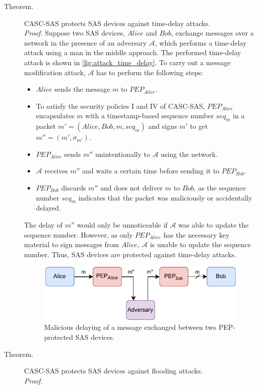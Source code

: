 \begin{description}
    \item[Theorem.] CASC-SAS protects SAS devices against time-delay attacks.\\
    \textit{Proof.} Suppose two SAS devices, $Alice$ and $Bob$, exchange messages over a network in the presence of an adversary $\mathcal{A}$, which performs a time-delay attack using a man in the middle approach.
    The performed time-delay attack is shown in \autoref{fig:attack_time_delay}.
    To carry out a message modification attack, $\mathcal{A}$ has to perform the following steps:
    \begin{itemize}
        \item $Alice$ sends the message $m$ to $PEP_{Alice}$.
        \item To satisfy the security policies I and IV of CASC-SAS, $PEP_{Alice}$ encapsulates $m$ with a timestamp-based sequence number $seq_m$ in a packet $m' = (Alice, Bob, m, seq_m)$ and signs $m'$ to get $m'' = (m', \sigma_{m'})$.
        \item $PEP_{Alice}$ sends $m''$ unintentionally to $\mathcal{A}$ using the network.
        \item $\mathcal{A}$ receives $m''$ and waits a certain time before sending it to $PEP_{Bob}$.
        \item $PEP_{Bob}$ discards $m''$ and does not deliver $m$ to $Bob$, as the sequence number $seq_m$ indicates that the packet was maliciously or accidentally delayed.
    \end{itemize}
    The delay of $m''$ would only be unnoticeable if $\mathcal{A}$ was able to update the sequence number.
    However, as only $PEP_{Alice}$ has the necessary key material to sign messages from $Alice$, $\mathcal{A}$ is unable to update the sequence number.
    Thus, SAS devices are protected against time-delay attacks.
    \begin{figure}
        \centering
        \includegraphics[width=0.75\linewidth]{figures/attack_time_delay.drawio.pdf}
        \caption{Malicious delaying of a message exchanged between two PEP-protected SAS devices.}
        \label{fig:attack_time_delay}
    \end{figure}

    \item[Theorem.] CASC-SAS protects SAS devices against flooding attacks.\\
    \textit{Proof.}
\end{description}

